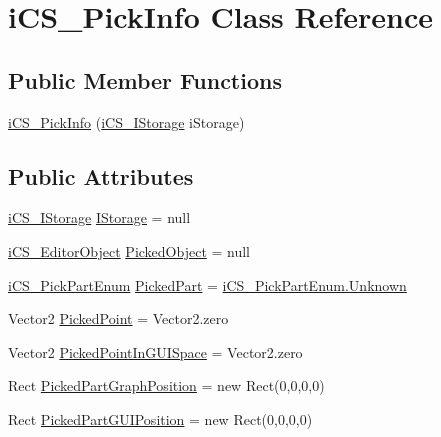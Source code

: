 \hypertarget{classi_c_s___pick_info}{\section{i\+C\+S\+\_\+\+Pick\+Info Class Reference}
\label{classi_c_s___pick_info}
}
\subsection*{Public Member Functions}
\begin{DoxyCompactItemize}
\item 
\hyperlink{classi_c_s___pick_info_a2ddbcbbbbbd779a9f056047088f84435}{i\+C\+S\+\_\+\+Pick\+Info} (\hyperlink{classi_c_s___i_storage}{i\+C\+S\+\_\+\+I\+Storage} i\+Storage)
\end{DoxyCompactItemize}
\subsection*{Public Attributes}
\begin{DoxyCompactItemize}
\item 
\hyperlink{classi_c_s___i_storage}{i\+C\+S\+\_\+\+I\+Storage} \hyperlink{classi_c_s___pick_info_a1761f147d4f28d37f6cf09c90c4a8d93}{I\+Storage} = null
\item 
\hyperlink{classi_c_s___editor_object}{i\+C\+S\+\_\+\+Editor\+Object} \hyperlink{classi_c_s___pick_info_a704979f906c7c80875b53e41a07506cd}{Picked\+Object} = null
\item 
\hyperlink{i_c_s___pick_info_8cs_abff3976c4f17e8c8c6c35d7753207f58}{i\+C\+S\+\_\+\+Pick\+Part\+Enum} \hyperlink{classi_c_s___pick_info_a3d3c3fd5a4e46a04e05daf6cbd99aa34}{Picked\+Part} = \hyperlink{i_c_s___object_type_enum_8cs_ae6c3dd6d8597380b56d94908eb431547a88183b946cc5f0e8c96b2e66e1c74a7e}{i\+C\+S\+\_\+\+Pick\+Part\+Enum.\+Unknown}
\item 
Vector2 \hyperlink{classi_c_s___pick_info_ab61b40c3301d0e8887507fc9009dd866}{Picked\+Point} = Vector2.\+zero
\item 
Vector2 \hyperlink{classi_c_s___pick_info_a0ab5802ece1dafab0eadc9405c40f653}{Picked\+Point\+In\+G\+U\+I\+Space} = Vector2.\+zero
\item 
Rect \hyperlink{classi_c_s___pick_info_aa46d3175ae28400ff751f566125a839b}{Picked\+Part\+Graph\+Position} = new Rect(0,0,0,0)
\item 
Rect \hyperlink{classi_c_s___pick_info_a16f6b05ea00855c3b86080af99cb7124}{Picked\+Part\+G\+U\+I\+Position} = new Rect(0,0,0,0)
\end{DoxyCompactItemize}


